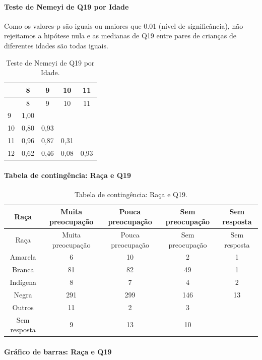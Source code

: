\documentclass[]{article}
\let\oldparagraph\paragraph
\renewcommand{\paragraph}[1]{\oldparagraph{#1}\mbox{}}
\begin{document}
\hypertarget{teste-de-nemeyi-de-q19-por-idade}{%
\paragraph{Teste de Nemeyi de Q19 por Idade}\label{teste-de-nemeyi-de-q19-por-idade}}

Como os valores-p são iguais ou maiores que 0.01 (nível de significância), não rejeitamos a hipótese nula e as medianas de Q19 entre pares de crianças de diferentes idades são todas iguais.

\begin{longtable}[]{@{}lcccc@{}}
\caption{\label{tab:unnamed-chunk-337}Teste de Nemeyi de Q19 por Idade.}\tabularnewline
\toprule
& 8 & 9 & 10 & 11\tabularnewline
\midrule
\endfirsthead
\toprule
& 8 & 9 & 10 & 11\tabularnewline
\midrule
\endhead
9 & 1,00 & & &\tabularnewline
10 & 0,80 & 0,93 & &\tabularnewline
11 & 0,96 & 0,87 & 0,31 &\tabularnewline
12 & 0,62 & 0,46 & 0,08 & 0,93\tabularnewline
\bottomrule
\end{longtable}

\cleardoublepage

\hypertarget{tabela-de-continguxeancia-rauxe7a-e-q19}{%
\paragraph{Tabela de contingência: Raça e Q19}\label{tabela-de-continguxeancia-rauxe7a-e-q19}}

\begin{longtable}[]{@{}ccccc@{}}
\caption{\label{tab:unnamed-chunk-338}Tabela de contingência: Raça e Q19.}\tabularnewline
\toprule
Raça & Muita preocupação & Pouca preocupação & Sem preocupação & Sem resposta\tabularnewline
\midrule
\endfirsthead
\toprule
Raça & Muita preocupação & Pouca preocupação & Sem preocupação & Sem resposta\tabularnewline
\midrule
\endhead
Amarela & 6 & 10 & 2 & 1\tabularnewline
Branca & 81 & 82 & 49 & 1\tabularnewline
Indígena & 8 & 7 & 4 & 2\tabularnewline
Negra & 291 & 299 & 146 & 13\tabularnewline
Outros & 11 & 2 & 3 &\tabularnewline
Sem resposta & 9 & 13 & 10 &\tabularnewline
\bottomrule
\end{longtable}

\hypertarget{gruxe1fico-de-barras-rauxe7a-e-q19}{%
\paragraph{Gráfico de barras: Raça e Q19}\label{gruxe1fico-de-barras-rauxe7a-e-q19}}
\end{document}
